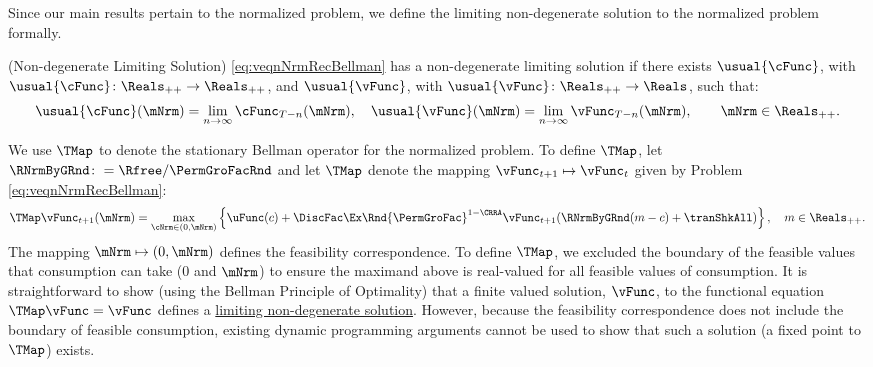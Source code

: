 \documentclass[BufferStockTheory]{subfiles}
\begin{document}
\hypertarget{sensible}{}\hypertarget{useful}{}
\hypertarget{Definition-of-a-Nondegenerate-Solution and Bellman}{}
Since our main results pertain to the normalized problem, we define the limiting non-degenerate solution to the normalized problem formally.

\begin{definition}\label{def:nondegeneracy}(Non-degenerate Limiting Solution)
\ref{eq:veqnNrmRecBellman} has a non-degenerate limiting solution if there exists $ \usual{\cFunc}$, with $\usual{\cFunc}\colon \Reals_{++}\rightarrow \Reals_{++}$, and $ \usual{\vFunc}$, with $\usual{\vFunc}\colon \Reals_{++}\rightarrow \Reals$, such that:
%
\begin{align*}
  \usual{\cFunc}(\mNrm) =  \lim_{n \rightarrow \infty} \cFunc_{T-n}(\mNrm), \quad \usual{\vFunc}(\mNrm)  =  \lim_{n \rightarrow \infty} \vFunc_{T-n}(\mNrm), \qquad \mNrm \in \Reals_{++} \notag.
\end{align*}
\end{definition}


\hypertarget{Stationary-Bellman-Operator}{}

We use $\TMap$ to denote the stationary Bellman operator for the normalized problem.
To define $\TMap$, let $\RNrmByGRnd \colon = \Rfree/\PermGroFacRnd$ and let $\TMap$ denote the mapping $\vFunc_{t+1} \mapsto \vFunc_{t}$ given by Problem \ref{eq:veqnNrmRecBellman}:
%
\begin{equation}\label{eq:maintmap}
  \TMap \vFunc_{t+1}(\mNrm) = \max_{\cNrm \in (0, \mNrm) }  \left\{
    \uFunc(c) + \DiscFac\Ex\Rnd{\PermGroFac}^{1-\CRRA}\vFunc_{t+1}(\RNrmByGRnd(m - c) + \tranShkAll)
  \right\}, \quad m \in \Reals_{++}.  
\end{equation}
%
The mapping $\mNrm\mapsto (0, \mNrm)$ defines the feasibility correspondence.
To define $\TMap$, we excluded the boundary of the feasible values that consumption can take ($0$ and $\mNrm$) to ensure the maximand above is real-valued for all feasible values of consumption.
It is straightforward to show (using the Bellman Principle of Optimality) that a finite valued solution, $\vFunc$, to the functional equation $\TMap\vFunc = \vFunc$ defines a \hyperlink{sensible}{limiting non-degenerate solution}.
However, because the feasibility correspondence does not include the boundary of feasible consumption, existing dynamic programming arguments cannot be used to show that such a solution (a fixed point to $\TMap$) exists.
\end{document}
